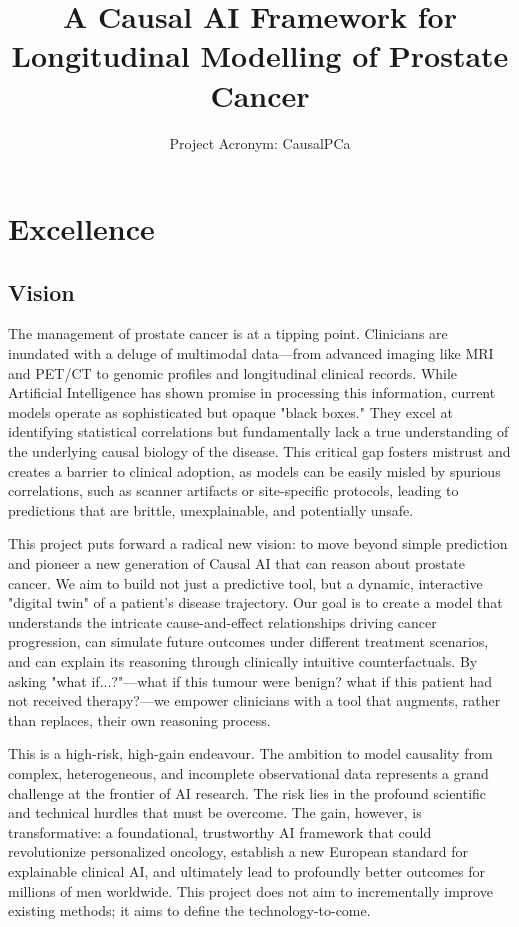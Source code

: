\documentclass[11pt, a4paper]{article}
\title{A Causal AI Framework for Longitudinal Modelling of Prostate Cancer}
\author{Project Acronym: CausalPCa}
\date{}
\begin{document}
\maketitle

\section{Excellence}

\subsection{Vision}
The management of prostate cancer is at a tipping point. Clinicians are inundated with a deluge of multimodal data—from advanced imaging like MRI and PET/CT to genomic profiles and longitudinal clinical records. While Artificial Intelligence has shown promise in processing this information, current models operate as sophisticated but opaque "black boxes." They excel at identifying statistical correlations but fundamentally lack a true understanding of the underlying causal biology of the disease. This critical gap fosters mistrust and creates a barrier to clinical adoption, as models can be easily misled by spurious correlations, such as scanner artifacts or site-specific protocols, leading to predictions that are brittle, unexplainable, and potentially unsafe.

This project puts forward a radical new vision: to move beyond simple prediction and pioneer a new generation of Causal AI that can reason about prostate cancer. We aim to build not just a predictive tool, but a dynamic, interactive "digital twin" of a patient's disease trajectory. Our goal is to create a model that understands the intricate cause-and-effect relationships driving cancer progression, can simulate future outcomes under different treatment scenarios, and can explain its reasoning through clinically intuitive counterfactuals. By asking "what if...?"—what if this tumour were benign? what if this patient had not received therapy?—we empower clinicians with a tool that augments, rather than replaces, their own reasoning process.

This is a high-risk, high-gain endeavour. The ambition to model causality from complex, heterogeneous, and incomplete observational data represents a grand challenge at the frontier of AI research. The risk lies in the profound scientific and technical hurdles that must be overcome. The gain, however, is transformative: a foundational, trustworthy AI framework that could revolutionize personalized oncology, establish a new European standard for explainable clinical AI, and ultimately lead to profoundly better outcomes for millions of men worldwide. This project does not aim to incrementally improve existing methods; it aims to define the technology-to-come.
\end{document}
